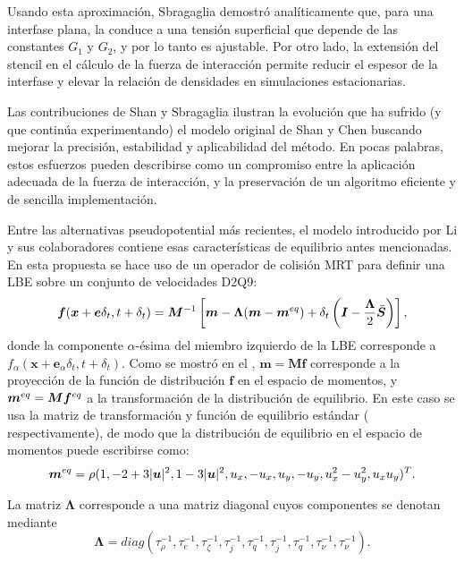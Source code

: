 Usando esta aproximaci\'on, Sbragaglia demostr\'o anal\'iticamente que, para una interfase plana, la  conduce a una tensi\'on superficial que depende de las constantes $G_1$ y $G_2$, y por lo tanto es ajustable. Por otro lado, la extensi\'on del stencil en el c\'alculo de la fuerza de interacci\'on permite reducir el espesor de la interfase y elevar la relaci\'on de densidades en simulaciones estacionarias.


Las contribuciones de Shan y Sbragaglia ilustran la evoluci\'on que ha sufrido (y que contin\'ua experimentando) el modelo original de Shan y Chen buscando mejorar la precisi\'on, estabilidad y aplicabilidad del m\'etodo. En pocas palabras, estos esfuerzos pueden describirse como un compromiso entre la aplicaci\'on adecuada de la fuerza de interacci\'on, y la preservaci\'on de un algoritmo eficiente y de sencilla implementaci\'on.

Entre las alternativas pseudopotential m\'as recientes, el modelo introducido por Li y sus colaboradores \cite{li_lattice_2013} contiene esas caracter\'isticas de equilibrio antes mencionadas. En esta propuesta se hace uso de un operador de colisi\'on MRT para definir una LBE sobre un conjunto de velocidades D2Q9:
\begin{equation}
	\bm{f} (\bm{x} + \bm{e}\delta_t, t+\delta_t) = \bm{M}^{-1}\left[ \bm{m} - \bm{\Lambda}(\bm{m} - \bm{m}^{eq})  + \delta_t \left( \bm{I} - \dfrac{\bm{\Lambda}}{2} \bar{\bm{S}} \right) \right],
	\label{eq:lbe_li}
\end{equation}
donde la componente $\alpha$-\'esima del miembro izquierdo de la LBE corresponde a $f_{\alpha}(\bm{x}+\bm{e}_{\alpha}\delta_t, t+\delta_t)$. Como se mostr\'o en el , $\bm{m} = \bm{Mf}$ corresponde a la proyecci\'on de la funci\'on de distribuci\'on $\bm{f}$ en el espacio de momentos, y $\bm{m}^{eq} = \bm{M}\bm{f}^{eq}$ a la transformaci\'on de la distribuci\'on de equilibrio. En este caso se usa la matriz de transformaci\'on y funci\'on de equilibrio est\'andar ( respectivamente), de modo que la distribuci\'on de equilibrio en el espacio de momentos puede escribirse como:
\begin{equation}
\bm{m}^{eq} = \rho (1, -2+3|\bm{u}|^2, 1-3|\bm{u}|^2, u_x, -u_x, u_y, -u_y, u_x^2-u_y^2, u_xu_y)^T.
\label{eq:feq_li}
\end{equation}

La matriz $\bm{\Lambda}$ corresponde a una matriz diagonal cuyos componentes se denotan mediante
\begin{equation}
	\bm{\Lambda}=diag(\tau_{\rho}^{-1},\tau_{e}^{-1},\tau_{\zeta}^{-1},\tau_{j}^{-1},\tau_{q}^{-1},\tau_{j}^{-1},\tau_{q}^{-1},\tau_{\nu}^{-1},\tau_{\nu}^{-1}).
\end{equation}

